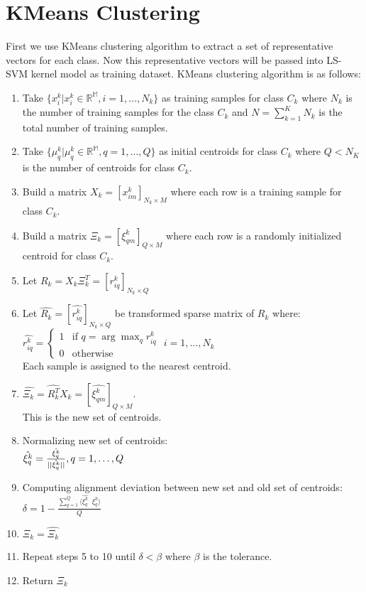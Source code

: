 \documentclass[conference]{IEEEtran}
\begin{document}
    \section{KMeans Clustering}\label{sec:kmeans-clustering}
    First we use KMeans clustering algorithm to extract a set of representative vectors for each class.
    Now this representative vectors will be passed into LS-SVM kernel model as training dataset.
    KMeans clustering algorithm is as follows:
    \begin{enumerate}
        \item Take $\{x_{i}^{k}|x_{i}^{k} \in \mathbb{R^{M}}, i=1,\ldots,N_{k}\}$ as training samples for class $C_{k}$ where
        $N_{k}$ is the number of training samples for the class $C_{k}$ and $N = \sum_{k=1}^{K}N_{k}$ is the total
        number of training samples.
        \item Take $\{\mu_{q}^{k}|\mu_{q}^{k} \in \mathbb{R^{M}}, q=1,\ldots,Q \}$ as initial centroids
        for class $C_{k}$ where $Q<N_{K}$ is the number of centroids for class $C_{k}$.
        \item Build a matrix $X_{k} = [x_{im}^{k}]_{N_{k} \times M}$ where each row is a training sample for class $C_{k}$.
        \item Build a matrix $\Xi_{k} = [\xi_{qm}^{k}]_{Q \times M}$ where each row is a randomly initialized centroid
        for class $C_{k}$.
        \item Let $R_{k} = X_{k}\Xi_{k}^{T} = [r_{iq}^{k}]_{N_{k}\times Q}$
        \item Let $\hat{R_{k}} = [\hat{r_{iq}^{k}}]_{N_{k}\times Q}$ be transformed sparse matrix of $R_{k}$ where: \\
        $\hat{r_{iq}^{k}} = \begin{cases}
                                1 & \text{if } q = \arg \max_{q}r_{iq}^{k} \\
                                0 & \text{otherwise}
        \end{cases}$
        $i = 1,\ldots,N_{k}$\\
        Each sample is assigned to the nearest centroid.
        \item $\hat{\Xi_{k}} = \hat{R_{k}^{T}}X_{k} = [\hat{\xi_{qm}^{k}}]_{Q \times M}$. \\
        This is the new set of centroids.
        \item Normalizing new set of centroids: \\
        $\hat{\xi_{q}^{k}} = \frac{\hat{\xi_{q}^{k}}}{|| \hat{\xi_{q}^{k}} ||} ,\\ q=1,\ldots,Q$
        \item Computing alignment deviation between new set and old set of centroids: \\
        $\delta = 1 - \frac{\sum_{q=1}^{Q}\langle \hat{\xi_{q}^{k}}\; \; \xi_{q}^{k} \rangle}{Q}$
        \item $\Xi_{k} = \hat{\Xi_{k}}$
        \item Repeat steps 5 to 10 until $\delta < \beta $ where $\beta$ is the tolerance.
        \item Return $\Xi_{k}$
    \end{enumerate}
\end{document}
